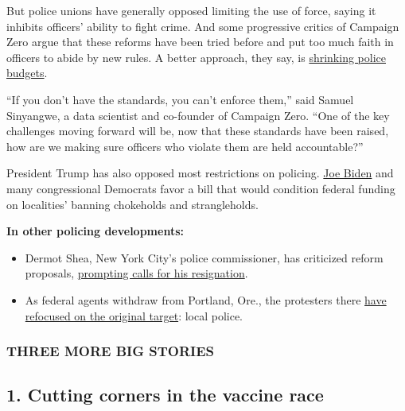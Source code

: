 But police unions have generally opposed limiting the use of force,
saying it inhibits officers' ability to fight crime. And some
progressive critics of Campaign Zero argue that these reforms have been
tried before and put too much faith in officers to abide by new rules. A
better approach, they say, is
\href{https://www.vice.com/en_us/article/ep4xy7/what-does-defund-and-abolish-the-police-mean}{shrinking
police budgets}.

``If you don't have the standards, you can't enforce them,'' said Samuel
Sinyangwe, a data scientist and co-founder of Campaign Zero. ``One of
the key challenges moving forward will be, now that these standards have
been raised, how are we making sure officers who violate them are held
accountable?''

President Trump has also opposed most restrictions on policing.
\href{https://www.usatoday.com/story/opinion/2020/06/10/biden-root-out-systemic-racism-not-just-divisive-trump-talk-column/5327631002/}{Joe
Biden} and many congressional Democrats favor a bill that would
condition federal funding on localities' banning chokeholds and
strangleholds.

\textbf{In other policing developments:}

\begin{itemize}
\item
  Dermot Shea, New York City's police commissioner, has criticized
  reform proposals,
  \href{https://www.nytimes3xbfgragh.onion/2020/08/03/nyregion/police-shea-de-blasio-nyc.html}{prompting
  calls for his resignation}.
\item
  As federal agents withdraw from Portland, Ore., the protesters there
  \href{https://www.nytimes3xbfgragh.onion/2020/08/02/us/portland-protests-.html}{have
  refocused on the original target}: local police.
\end{itemize}

\hypertarget{three-more-big-stories}{%
\subsubsection{\texorpdfstring{\textbf{THREE MORE BIG
STORIES}}{THREE MORE BIG STORIES}}\label{three-more-big-stories}}

\hypertarget{1-cutting-corners-in-the-vaccine-race}{%
\subsection{1. Cutting corners in the vaccine
race}\label{1-cutting-corners-in-the-vaccine-race}}


